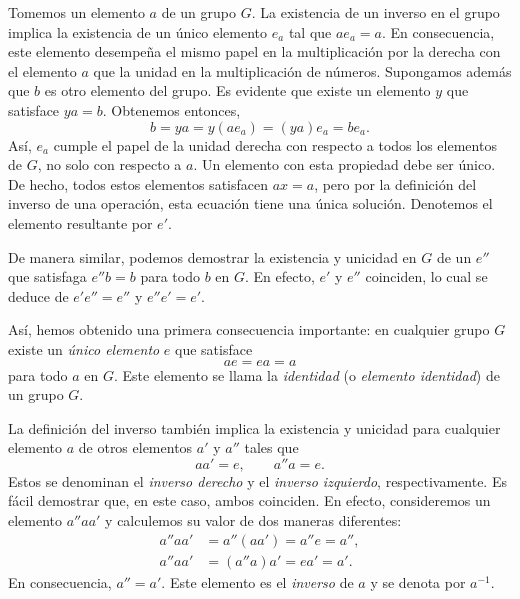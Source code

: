 Tomemos un elemento $a$ de un grupo $G$. La existencia de un inverso en el grupo implica la existencia de un único elemento $e_a$ tal que $ae_a = a$. En consecuencia, este elemento desempeña el mismo papel en la multiplicación por la derecha con el elemento $a$ que la unidad en la multiplicación de números. Supongamos además que $b$ es otro elemento del grupo. Es evidente que existe un elemento $y$ que satisface $ya = b$. Obtenemos entonces,
$$b = ya = y (ae_a) = (ya) e_a = be_a.$$
Así, $e_a$ cumple el papel de la unidad derecha con respecto a todos los elementos de $G$, no solo con respecto a $a$. Un elemento con esta propiedad debe ser único. De hecho, todos estos elementos satisfacen $ax = a$, pero por la definición del inverso de una operación, esta ecuación tiene una única solución. Denotemos el elemento resultante por $e'$.

De manera similar, podemos demostrar la existencia y unicidad en $G$ de un $e''$ que satisfaga $e''b = b$ para todo $b$ en $G$. En efecto, $e'$ y $e''$ coinciden, lo cual se deduce de $e'e'' = e''$ y $e''e' = e'$.

Así, hemos obtenido una primera consecuencia importante: en cualquier grupo $G$ existe un \textit{único elemento} $e$ que satisface
$$ae = ea = a$$
para todo $a$ en $G$. Este elemento se llama la \emph{identidad} (o \emph{elemento identidad}) de un grupo $G$.

La definición del inverso también implica la existencia y unicidad para cualquier elemento $a$ de otros elementos $a'$ y $a''$ tales que
$$aa' = e, \qquad a''a = e.$$
Estos se denominan el \emph{inverso derecho} y el \emph{inverso izquierdo}, respectivamente. Es fácil demostrar que, en este caso, ambos coinciden. En efecto, consideremos un elemento $a''aa'$ y calculemos su valor de dos maneras diferentes:
\begin{align*}
    a''aa' & = a'' (aa') = a''e = a'', \\
    a''aa' & = (a''a) a' = ea' = a'.
\end{align*}
En consecuencia, $a'' = a'$. Este elemento es el \emph{inverso} de $a$ y se denota por $a^{-1}$.

